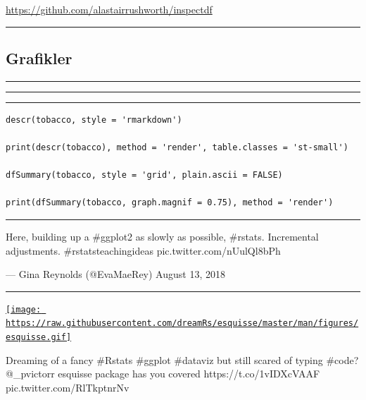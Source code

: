\documentclass[]{article}
\begin{document}
\url{https://github.com/alastairrushworth/inspectdf}

\begin{center}\rule{0.5\linewidth}{\linethickness}\end{center}

\hypertarget{grafikler}{%
\subsection{Grafikler}\label{grafikler}}

\begin{center}\rule{0.5\linewidth}{\linethickness}\end{center}

\begin{center}\rule{0.5\linewidth}{\linethickness}\end{center}

\begin{center}\rule{0.5\linewidth}{\linethickness}\end{center}

\begin{verbatim}
descr(tobacco, style = 'rmarkdown')

print(descr(tobacco), method = 'render', table.classes = 'st-small')

dfSummary(tobacco, style = 'grid', plain.ascii = FALSE)

print(dfSummary(tobacco, graph.magnif = 0.75), method = 'render')
\end{verbatim}

\begin{center}\rule{0.5\linewidth}{\linethickness}\end{center}

Here, building up a \#ggplot2 as slowly as possible, \#rstats.
Incremental adjustments. \#rstatsteachingideas
pic.twitter.com/nUulQl8bPh

--- Gina Reynolds (@EvaMaeRey) August 13, 2018

\begin{center}\rule{0.5\linewidth}{\linethickness}\end{center}

\href{https://github.com/dreamRs/esquisse}{\texttt{[image: https://raw.githubusercontent.com/dreamRs/esquisse/master/man/figures/esquisse.gif]}}

Dreaming of a fancy \#Rstats \#ggplot \#dataviz but still scared of
typing \#code? @\_pvictorr esquisse package has you covered
https://t.co/1vIDXcVAAF pic.twitter.com/RlTkptnrNv
\end{document}
